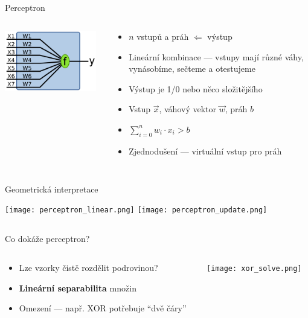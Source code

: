 \documentclass{beamer}
\begin{document}
\subsection{}
\begin{frame}{Perceptron}
\begin{columns}
\begin{column}{4cm}
\includegraphics[width=4cm]{Perceptron.pdf}
\end{column}
\begin{column}{7cm}
\begin{itemize}
\item $n$ vstupů a práh $\Leftarrow$ výstup
\item Lineární kombinace --- vstupy mají různé váhy,\\ vynásobíme, sečteme a otestujeme
\item Výstup je 1/0 nebo něco složitějšího
\pause
\item Vstup $\vec x$, váhový vektor $\vec w$, práh $b$
\item $\sum_{i=0}^n w_i \cdot x_i > b$
\item Zjednodušení --- virtuální vstup pro práh
\end{itemize}
\end{column}
\end{columns}
\end{frame}

\subsection{}
\begin{frame}{Geometrická interpretace}
\begin{center}
\texttt{[image: perceptron\_linear.png]}
\texttt{[image: perceptron\_update.png]}
\end{center}
\end{frame}

\subsection{}
\begin{frame}{Co dokáže perceptron?}
\begin{columns}
\begin{column}{7cm}
\begin{itemize}
\item Lze vzorky čistě rozdělit podrovinou?
\item {\bf Lineární separabilita} množin
\item Omezení --- např. XOR potřebuje ``dvě čáry''
\end{itemize}
\end{column}
\begin{column}{4cm}
\texttt{[image: xor\_solve.png]}
\end{column}
\end{columns}
\end{frame}
\end{document}
